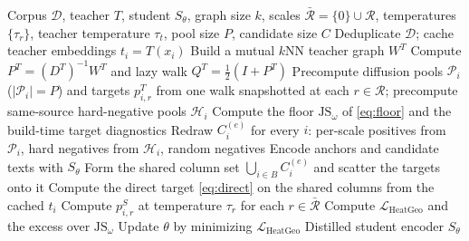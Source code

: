 \begin{algorithm}[t]
\caption{HeatGeo Training}
\label{alg:heatgeo}
\begin{algorithmic}[1]
\REQUIRE Corpus $\mathcal{D}$, teacher $T$, student $S_{\theta}$, graph size $k$, scales $\bar{\mathcal{R}}=\{0\}\cup\mathcal{R}$, temperatures $\{\tau_r\}$, teacher temperature $\tau_t$, pool size $P$, candidate size $C$
\STATE Deduplicate $\mathcal{D}$; cache teacher embeddings $t_i=T(x_i)$
\STATE Build a mutual $k$NN teacher graph $W^T$
\STATE Compute $P^T=(D^T)^{-1}W^T$ and lazy walk $Q^T=\frac{1}{2}(I+P^T)$
\STATE Precompute diffusion pools $\mathcal{P}_i$ ($|\mathcal{P}_i|=P$) and targets $p_{i,r}^T$ from one walk snapshotted at each $r\in\mathcal{R}$; precompute same-source hard-negative pools $\mathcal{H}_i$
\STATE Compute the floor $\mathrm{JS}_{\omega}$ of \eqref{eq:floor} and the build-time target diagnostics
    \STATE Redraw $C_i^{(e)}$ for every $i$: per-scale positives from $\mathcal{P}_i$, hard negatives from $\mathcal{H}_i$, random negatives
        \STATE Encode anchors and candidate texts with $S_{\theta}$
        \STATE Form the shared column set $\bigcup_{i\in B}C_i^{(e)}$ and scatter the targets onto it
        \STATE Compute the direct target \eqref{eq:direct} on the shared columns from the cached $t_i$
        \STATE Compute $p_{i,r}^S$ at temperature $\tau_r$ for each $r\in\bar{\mathcal{R}}$
        \STATE Compute $\mathcal{L}_{\mathrm{HeatGeo}}$ and the excess over $\mathrm{JS}_{\omega}$
        \STATE Update $\theta$ by minimizing $\mathcal{L}_{\mathrm{HeatGeo}}$
    \ENDFOR
\ENDFOR
\RETURN Distilled student encoder $S_{\theta}$
\end{algorithmic}
\end{algorithm}

